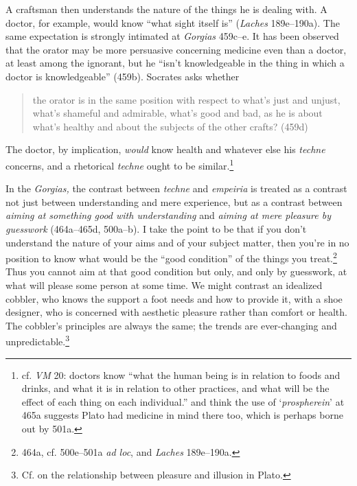﻿\documentclass[11pt]{amsart}
\begin{document}
A craftsman then understands the nature of the things he is dealing with. A doctor, for example, would know ``what sight itself is'' (\emph{Laches} 189e--190a). The same expectation is strongly intimated at \emph{Gorgias} 459c--e. It has been observed that the orator may be more persuasive concerning medicine even than a doctor, at least among the ignorant, but he ``isn't knowledgeable in the thing in which a doctor is knowledgeable'' (459b). Socrates asks whether\small\begin{quote}the orator is in the same position with respect to what's just and unjust, what's shameful and admirable, what's good and bad, as he is about what's healthy and about the subjects of the other crafts? (459d)\end{quote}\normalsize The doctor, by implication, \emph{would} know health and whatever else his \emph{techne} concerns, and a rhetorical \emph{techne} ought to be similar.\footnote{cf. \emph{VM} 20: doctors know ``what the human being is in relation to foods and drinks, and what it is in relation to other practices, and what will be the effect of each thing on each individual.'' \citet{dodds1959pg} and \citet{irwin1979pg} think the use of `\emph{prospherein}' at 465a suggests Plato had medicine in mind there too, which is perhaps borne out by 501a.}

In the \emph{Gorgias,} the contrast between \emph{techne} and \emph{empeiria} is treated as a contrast not just between understanding and mere experience, but as a contrast between \emph{aiming at something good with understanding} and \emph{aiming at mere pleasure by guesswork} (464a--465d, 500a--b). I take the point to be that if you don't understand the nature of your aims and of your subject matter, then you're in no position to know what would be the ``good condition'' of the things you treat.\footnote{464a, cf. \citet{irwin1979pg} 500e--501a \emph{ad loc}, and \emph{Laches} 189e--190a.} Thus you cannot aim at that good condition but only, and only by guesswork, at what will please some person at some time. We might contrast an idealized cobbler, who knows the support a foot needs and how to provide it, with a shoe designer, who is concerned with aesthetic pleasure rather than comfort or health. The cobbler's principles are always the same; the trends are ever-changing and unpredictable.\footnote{Cf. \citet{moss2006pai} on the relationship between pleasure and illusion in Plato.}

\end{document}
